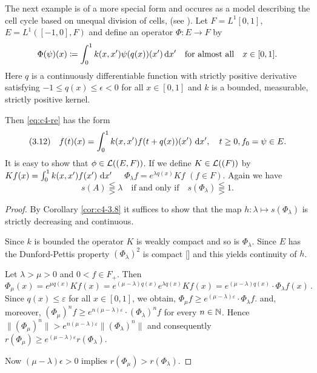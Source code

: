 \begin{example}\label{ex:c4-3.11}
The next example is of a more special form and occures as a model describing the cell cycle based on unequal division of cells, (see  \citet{arinokimmel:1985}).
Let $F = L^{1}[0,1]$,\, $E = L^{1}([-1,0], F)$ and define an operator $\Phi \colon E \to F$ by
\[
\Phi(\psi)(x) \coloneqq \int_0^1 k(x,x')\psi(q(x))(x') \mathop{}\!\mathrm{d}{x}' \quad \text{for almost all} \quad x \in [0,1].
\]
Here $q$ is a continuously differentiable function with strictly positive derivative satisfying $-1 \leq q(x) \leq \epsilon < 0$ for all $x \in [0,1]$ and $k$ is a bounded, measurable, strictly positive kernel.

Then \eqref{eq:c4-re} has the form
\begin{equation} \label{eq:c4-3.12}
(3.12) \quad f(t)(x) = \int_{0}^{1} k(x,x')f(t+q(x))(x') \, \mathop{}\!\mathrm{d}{x}', \quad t \geq 0, f_{0} = \psi \in E.
\end{equation}
It is easy to show that $\phi \in \mathcal{L}((E,F))$.
If we define $K \in \mathcal{L}((F))$ by
$
Kf(x) = \int_{0}^{1} k(x,x')f(x') \, \mathop{}\!\mathrm{d}{x}'
$
%
\,  \,
$
\Phi_{\lambda}f = e^{\lambda q(x)}Kf \,\, (f \in F)
$.
Again we have 
\begin{equation*}\label{eq:c4-3.12-kgk1}
s(A) \lesseqqgtr \lambda \quad \text{if and only if} \quad s(\Phi_{\lambda}) \lesseqqgtr 1 .
\end{equation*}
\end{example}

\begin{proof}
By Corollary \ref{cor:c4-3.8} it suffices to show that the map $h \colon \lambda \mapsto s(\Phi_{\lambda})$ is strictly decreasing and continuous.

Since $k$ is bounded the operator $K$ is weakly compact and so is $\Phi_{\lambda}$.
Since $E$ has the Dunford-Pettis property $(\Phi_{\lambda})^{2}$ is compact [\citet[Theorem II.9.9]{schaefer:1974}] and this yields continuity of $h$.

Let $\lambda > \mu > 0$ and $0 < f \in F_{+}$.
Then 
\[
\Phi_{\mu}(x) = 
e^{\mu q(x)}K f(x) = 
e^{(\mu-\lambda)q(x)}e^{\lambda q(x)}Kf(x) =
e^{(\mu-\lambda)q(x)} \cdot \Phi_{\lambda}f(x)\, .
\]
Since $q(x) \leq \varepsilon$ for all $x \in [0,1]$, we obtain, $\Phi_{\mu}f \geq e^{(\mu-\lambda)\varepsilon} \cdot \Phi_{\lambda}f$.
and, moreover, $(\Phi_{\mu})^n f \geq e^{n(\mu-\lambda)\varepsilon} \cdot (\Phi_{\lambda})^n f$ for every $n \in \mathbb{N}$.
Hence $\|(\Phi_{\mu})^n\| > e^{n(\mu-\lambda)\varepsilon}\|(\Phi_{\lambda})^n\|$
and consequently $r(\Phi_{\mu}) \geq e^{(\mu-\lambda)\varepsilon}r(\Phi_{\lambda})$.

Now $(\mu-\lambda)\epsilon > 0$ implies $r(\Phi_{\mu}) > r(\Phi_{\lambda})$.
\end{proof}

